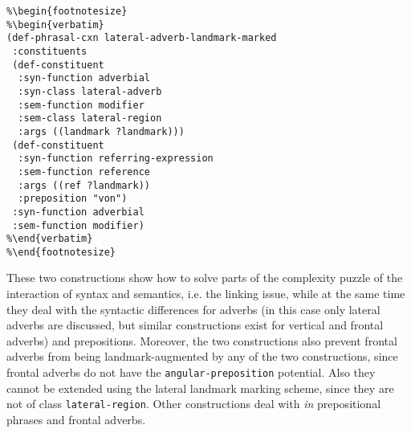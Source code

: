\ea
\begin{lstlisting}
%\begin{footnotesize}
%\begin{verbatim}
(def-phrasal-cxn lateral-adverb-landmark-marked
 :constituents
 (def-constituent
  :syn-function adverbial
  :syn-class lateral-adverb 
  :sem-function modifier
  :sem-class lateral-region
  :args ((landmark ?landmark)))
 (def-constituent
  :syn-function referring-expression
  :sem-function reference
  :args ((ref ?landmark))
  :preposition "von")
 :syn-function adverbial
 :sem-function modifier)
%\end{verbatim}
%\end{footnotesize}
\end{lstlisting}
\label{e:lateral-adverb-landmark-marked}
\z


These two constructions show how to solve parts of the  
complexity puzzle of the interaction of syntax and semantics, 
i.e. the linking issue, while at the same time they deal with the syntactic 
differences for adverbs (in this case only lateral adverbs are discussed, 
but similar constructions exist for vertical and frontal adverbs) and 
prepositions. Moreover, the two constructions also 
prevent frontal adverbs from being 
landmark-augmented by any of the two constructions, 
since frontal adverbs do not have
the {\footnotesize\tt angular-preposition} potential. Also they 
cannot be extended using the lateral 
landmark marking scheme, since they are not of class 
{\footnotesize\tt lateral-region}. Other constructions deal with 
\textit{in} prepositional phrases and frontal adverbs.

